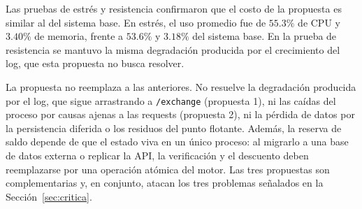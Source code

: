     Las pruebas de estrés y resistencia confirmaron que el costo de la propuesta es similar al del sistema base. En estrés,
    el uso promedio fue de $55.3\%$ de CPU y $3.40\%$ de memoria, frente a $53.6\%$ y $3.18\%$ del sistema base. En la prueba
    de resistencia se mantuvo la misma degradación producida por el crecimiento del log, que esta propuesta no busca resolver.

    La propuesta no reemplaza a las anteriores. No resuelve la degradación producida por el log, que sigue arrastrando a
    \texttt{/exchange} (propuesta 1), ni las caídas del proceso por causas ajenas a las requests (propuesta 2), ni la pérdida
    de datos por la persistencia diferida o los residuos del punto flotante. Además, la reserva de saldo depende de que el
    estado viva en un único proceso: al migrarlo a una base de datos externa o replicar la API, la verificación y el
    descuento deben reemplazarse por una operación atómica del motor. Las tres propuestas son complementarias y, en
    conjunto, atacan los tres problemas señalados en la Sección~\ref{sec:critica}.
